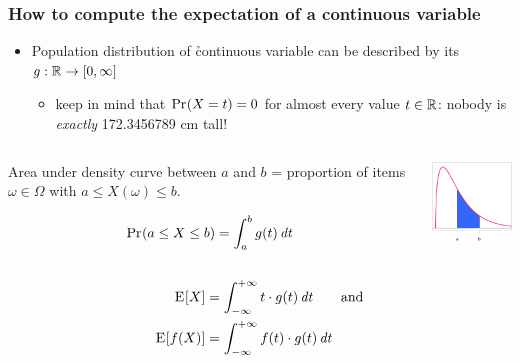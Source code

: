 \documentclass[t]{beamer} %
\begin{document}
\begin{frame}
  \frametitle{How to compute the expectation of a continuous variable}

  \begin{itemize}
  \item Population distribution of \h{continuous} variable can be described by
    its  $g: \mathbb{R}\to [0, \infty]$
    \begin{itemize}
    \item keep in mind that $\mathop{\mathrm{Pr}_{}}(X=t) = 0$ for almost every value $t\in\mathbb{R}$:
      nobody is \emph{exactly} 172.3456789 cm tall!
    \end{itemize}
  \end{itemize}
  
  \gap[.5]\pause
  \begin{columns}[c]
    \begin{column}{7.2cm}
      \begin{small}\raggedright
        Area under density curve between $a$ and $b$ = proportion of items
        $\omega\in\Omega$ with $a\leq X(\omega)\leq b$.
      \end{small}
      \[
      \mathop{\mathrm{Pr}_{}}(a\leq X\leq b) = \int_a^b g(t) \,\mathit{d{t}} 
      \]
      \begin{small}\raggedright
      \end{small}
    \end{column}
    \begin{column}{3cm}
      \includegraphics[width=3cm]{img/area_under_density}      
    \end{column}
  \end{columns}
  \pause
  \begin{align*}
    \mathrm{E}_{}[X] &= \int_{-\infty}^{+\infty} t\cdot g(t) \,\mathit{d{t}} \qquad \text{and}\\
    \mathrm{E}_{}[f(X)] &= \int_{-\infty}^{+\infty} f(t)\cdot g(t) \,\mathit{d{t}}
  \end{align*}

\end{frame}

\end{document}
